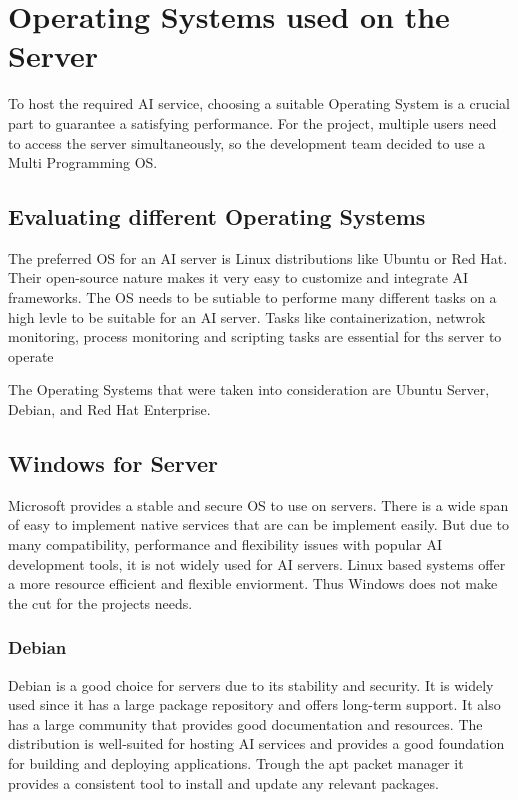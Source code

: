\cite{Kernel}



\section {Operating Systems used on the Server}

To host the required AI service, choosing a suitable Operating System is a crucial part to guarantee a satisfying performance.
For the project, multiple users need to access the server simultaneously, so the development team decided to use a Multi Programming OS.

\subsection {Evaluating different Operating Systems}

The preferred OS for an AI server is Linux distributions like Ubuntu or Red Hat.
Their open-source nature makes it very easy to customize and integrate AI frameworks.
The OS needs to be sutiable to performe many different tasks on a high levle to be suitable for an AI server. 
Tasks like containerization, netwrok monitoring, process monitoring and scripting tasks are essential for ths server to operate


The Operating Systems that were taken into consideration are Ubuntu Server, Debian, and Red Hat Enterprise. 


\cite{cao2024managing}

\subsection{Windows for Server}

Microsoft provides a stable and secure OS to use on servers. There is a wide span of easy to implement native services that are can be implement easily.
But due to many compatibility, performance and flexibility issues with popular AI development tools, it is not widely used for AI servers. 
Linux based systems offer a more resource efficient and flexible enviorment. Thus Windows does not make the cut for the projects needs.

\subsubsection{Debian}

Debian is a good choice for servers due to its stability and security. It is widely used since it has a large package repository and offers long-term support. It also has a large community that provides good documentation and resources. The distribution is well-suited for hosting AI services and provides a good foundation for building and deploying applications.
Trough the apt packet manager it provides a consistent tool to install and update any relevant packages.

